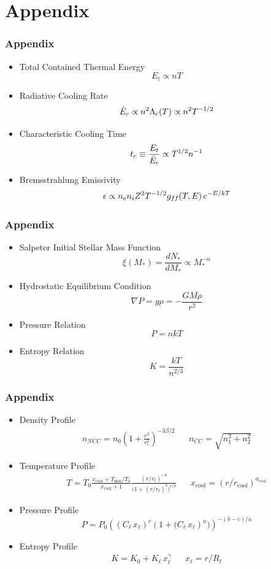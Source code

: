 	\appendix

	\section{Appendix}

	\begin{frame}
		\frametitle{Appendix}
		\begin{itemize}
			\item Total Contained Thermal Energy $$E_t \propto nT$$
			\item Radiative Cooling Rate $$\dot{E}_c \propto n^2 \Lambda_c(T) \propto n^2 T^{-1\kern-0.5pt/2}$$
			\item Characteristic Cooling Time $$t_c \equiv \frac{E_t}{\dot{E}_c} \propto T^{1\kern-0.5pt/2} n^{-1}$$
			\item Bremsstrahlung Emissivity $$\epsilon \propto n_e n_i Z^2 T^{-1\kern-0.5pt/2} g_{f\kern-0.5ptf}(T, E) \, e^{-E/kT}$$
		\end{itemize}
	\end{frame}

	\begin{frame}
		\frametitle{Appendix}
		\begin{itemize}
			\item Salpeter Initial Stellar Mass Function $$\xi(M_*) = \frac{dN_*}{dM_*} \propto M_*^{-\alpha}$$
			\item Hydrostatic Equilibrium Condition $$\nabla P = g\rho = -\frac{GM\rho}{r^2}$$
			\item Pressure Relation $$P = nkT$$
			\item Entropy Relation $$K = \frac{kT}{n^{2/3}}$$
		\end{itemize}
	\end{frame}

	\begin{frame}
		\frametitle{Appendix}
		\begin{itemize}
			\item Density Profile \begin{align*} &&&& n_{NCC} = n_0 \left( 1 + \frac{r^2}{r_c^2} \right)^{-3\beta / 2}
				  && n_{CC} = \sqrt{n_1^2 + n_2^2} &&&& \end{align*}
			\item Temperature Profile \begin{align*} && T = T_0 \frac{x_\text{cool} + T_\text{min} / T_0}{x_\text{cool} + 1}
				  \frac{(r / r_t)^{-a}}{\bigl( 1 + (r / r_t)^{b} \bigr)^{c/b}} && x_\text{cool} = (r / r_\text{cool})^{a_\text{cool}} && \end{align*}
			\item Pressure Profile $$P = P_0 \left( (C_\ell \, x_\ell)^c (1 + \bigl(C_\ell \, x_\ell)^a \bigr) \right)^{-(b-c)/a}$$
			\item Entropy Profile \begin{align*} &&&&&& K = K_0 + K_\ell \, x_\ell^\gamma && x_\ell = r / R_\ell &&&&&& \end{align*}
		\end{itemize}
	\end{frame}


